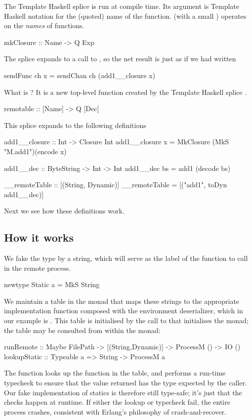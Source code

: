 \documentclass[preprint]{sigplanconf}
\begin{document}
The Template Haskell splice 
is run at compile time.  Its argument  is Template Haskell notation
for the (quoted) name of the  function.  
 (with a small ) operates on the \emph{names} of functions.
\begin{code}
  mkClosure :: Name -> Q Exp
\end{code}
The splice expands to a call to , 
so the net result is just as if we had written
\begin{code}
  sendFunc ch x = sendChan ch (add1__closure x)
\end{code}
What is ?  It is a new top-level function
created by the Template Haskell splice .
\begin{code}
  remotable :: [Name] -> Q [Dec]
\end{code}
This splice expands to the following definitions
\begin{code}
  add1__closure :: Int -> Closure Int
  add1__closure x = MkClosure (MkS "M.add1")(encode x)

  add1__dec :: ByteString -> Int -> Int
  add1__dec bs = add1 (decode bs)

  __remoteTable :: [(String, Dynamic)]
  __remoteTable = [("add1", toDyn add1__dec)]
\end{code}
Next we see how these definitions work.

\subsection{How it works}

We fake the  type by a string, which will serve as the 
label of the function to call in the remote process.
\begin{code}
  newtype Static a = MkS String
\end{code}
We maintain a table in the  monad that maps these strings
to the appropriate implementation function composed with the environment deserializer, which in our example is
.
This table is initialised by the call to  that initialises the
 monad; the table may be consulted from within the monad:
\begin{code}
  runRemote    :: Maybe FilePath
                   -> [(String,Dynamic)]
                       -> ProcessM () -> IO ()
  lookupStatic :: Typeable a => String -> ProcessM a
\end{code}
The  function looks up the function in the table,
and performs a run-time typecheck to ensure that the value returned
has the type expected by the caller.  Our fake implementation of
statics is therefore still type-safe; it's just that the checks happen
at runtime.  If either the lookup or typecheck fail, the entire 
process crashes, consistent with Erlang's philosophy of crash-and-recover.
\end{document}
